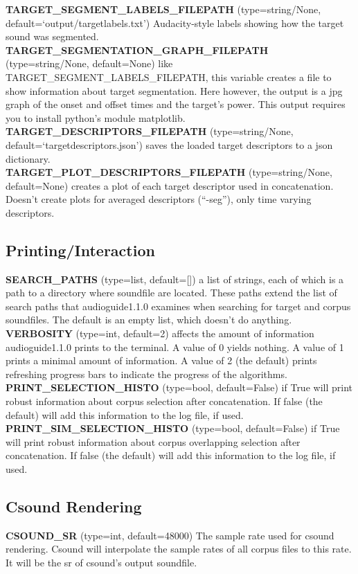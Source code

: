 \documentclass{article}
\newcommand{\optEntry}[4]{\textbf{#1} (type={\color{red}#2}, default={\color{ForestGreen}#3}) #4\hspace{0.5em}\\}
\newcommand{\ag}{audioguide1.1.0\xspace}
\begin{document}
\begin{spacing}{1.2}
\optEntry{TARGET\_SEGMENT\_LABELS\_FILEPATH}{string/None}{`output/targetlabels.txt'}{Audacity-style labels showing how the target sound was segmented.}

\optEntry{TARGET\_SEGMENTATION\_GRAPH\_FILEPATH}{string/None}{None}{like TARGET\_SEGMENT\_LABELS\_FILEPATH, this variable creates a file to show information about target segmentation.  Here however, the output is a jpg graph of the onset and offset times and the target's power.  This output requires you to install python's module matplotlib.}

\optEntry{TARGET\_DESCRIPTORS\_FILEPATH}{string/None}{`targetdescriptors.json'}{saves the loaded target descriptors to a json dictionary.}

\optEntry{TARGET\_PLOT\_DESCRIPTORS\_FILEPATH}{string/None}{None}{creates a plot of each target descriptor used in concatenation.  Doesn't create plots for averaged descriptors (``-seg''), only time varying descriptors.}



\subsection{Printing/Interaction}
\optEntry{SEARCH\_PATHS}{list}{[]}{a list of strings, each of which is a path to a directory where soundfile are located.  These paths extend the list of search paths that \ag examines when searching for target and corpus soundfiles.  The default is an empty list, which doesn't do anything.}

\optEntry{VERBOSITY}{int}{2}{affects the amount of information \ag prints to the terminal.  A value of 0 yields nothing.  A value of 1 prints a minimal amount of information.  A value of 2 (the default) prints refreshing progress bars to indicate the progress of the algorithms.}

\optEntry{PRINT\_SELECTION\_HISTO}{bool}{False}{if True will print robust information about corpus selection after concatenation.  If false (the default) will add this information to the log file, if used.}

\optEntry{PRINT\_SIM\_SELECTION\_HISTO}{bool}{False}{if True will print robust information about corpus overlapping selection after concatenation.  If false (the default) will add this information to the log file, if used.}


\subsection{Csound Rendering}
\optEntry{CSOUND\_SR}{int}{48000}{The sample rate used for csound rendering.  Csound will interpolate the sample rates of all corpus files to this rate.  It will be the sr of csound's output soundfile.}


\end{spacing}
\end{document}
